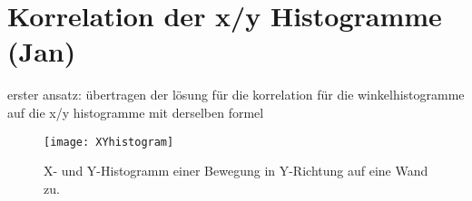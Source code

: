 \section{Korrelation der x/y Histogramme (Jan)}

erster ansatz: übertragen der lösung für die korrelation für die winkelhistogramme auf die x/y histogramme mit derselben formel

\begin{figure}
	\centering
	\texttt{[image: XYhistogram]}
	\caption{X- und Y-Histogramm einer Bewegung in Y-Richtung auf eine Wand zu.}
	\label{fig:xyhistogram}
\end{figure}